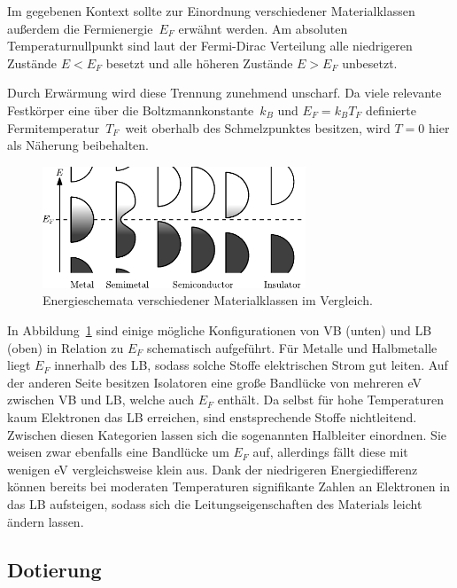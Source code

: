 Im gegebenen Kontext sollte zur Einordnung verschiedener Materialklassen außerdem die Fermienergie~$E_F$ erwähnt werden.
Am absoluten Temperaturnullpunkt sind laut der Fermi-Dirac Verteilung alle niedrigeren Zustände $E < E_F$ besetzt
und alle höheren Zustände $E > E_F$ unbesetzt. \enlargethispage{\baselineskip}\pagebreak

Durch Erwärmung wird diese Trennung zunehmend unscharf. Da viele relevante Festkörper eine über die Boltzmannkonstante~$k_B$
und $E_F = k_B T_F$ definierte Fermitemperatur~$T_F$~weit oberhalb des Schmelzpunktes besitzen, wird $T = 0$ hier als
Näherung beibehalten.

\begin{figure}[H]
    \vspace{3ex}
    \centering
    \includegraphics[width=0.7\textwidth]{content/grafik/bandstructure.pdf}
    \caption{Energieschemata verschiedener Materialklassen im Vergleich. \cite{wiki_band}}
    \label{fig:schema}
\end{figure}

In Abbildung~\ref{fig:schema} sind einige mögliche Konfigurationen von VB (unten) und LB (oben) in Relation zu $E_F$
schematisch aufgeführt. Für Metalle und Halbmetalle liegt $E_F$ innerhalb des LB, sodass solche Stoffe elektrischen Strom
gut leiten. Auf der anderen Seite besitzen Isolatoren eine große Bandlücke von mehreren \unit{\electronvolt}
zwischen VB und LB, welche auch $E_F$ enthält. Da selbst für hohe Temperaturen kaum Elektronen das LB erreichen, sind
enstsprechende Stoffe nichtleitend. Zwischen diesen Kategorien lassen sich die sogenannten Halbleiter einordnen. Sie
weisen zwar ebenfalls eine Bandlücke um $E_F$ auf, allerdings fällt diese mit wenigen \unit{\electronvolt} vergleichsweise
klein aus. Dank der niedrigeren Energiedifferenz können bereits bei moderaten Temperaturen signifikante Zahlen an Elektronen
in das LB aufsteigen, sodass sich die Leitungseigenschaften des Materials leicht ändern lassen.

\subsection{Dotierung}

